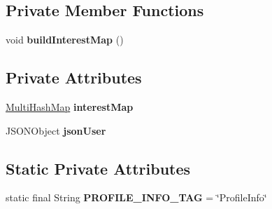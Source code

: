 \subsection*{Private Member Functions}
\begin{DoxyCompactItemize}
\item 
void {\bfseries build\+Interest\+Map} ()\hypertarget{classcom_1_1example_1_1sebastian_1_1tindertp_1_1commonTools_1_1ProfileInfo_a8d562369fc96d3a45db688558a87b998}{}\label{classcom_1_1example_1_1sebastian_1_1tindertp_1_1commonTools_1_1ProfileInfo_a8d562369fc96d3a45db688558a87b998}

\end{DoxyCompactItemize}
\subsection*{Private Attributes}
\begin{DoxyCompactItemize}
\item 
\hyperlink{classcom_1_1example_1_1sebastian_1_1tindertp_1_1commonTools_1_1MultiHashMap}{Multi\+Hash\+Map} {\bfseries interest\+Map}\hypertarget{classcom_1_1example_1_1sebastian_1_1tindertp_1_1commonTools_1_1ProfileInfo_abbc20b5242ba1b2957b09cf608342bd9}{}\label{classcom_1_1example_1_1sebastian_1_1tindertp_1_1commonTools_1_1ProfileInfo_abbc20b5242ba1b2957b09cf608342bd9}

\item 
J\+S\+O\+N\+Object {\bfseries json\+User}\hypertarget{classcom_1_1example_1_1sebastian_1_1tindertp_1_1commonTools_1_1ProfileInfo_aec90faa9e53b0ace65c0cbe0f6c97c67}{}\label{classcom_1_1example_1_1sebastian_1_1tindertp_1_1commonTools_1_1ProfileInfo_aec90faa9e53b0ace65c0cbe0f6c97c67}

\end{DoxyCompactItemize}
\subsection*{Static Private Attributes}
\begin{DoxyCompactItemize}
\item 
static final String {\bfseries P\+R\+O\+F\+I\+L\+E\+\_\+\+I\+N\+F\+O\+\_\+\+T\+AG} = \char`\"{}Profile\+Info\char`\"{}\hypertarget{classcom_1_1example_1_1sebastian_1_1tindertp_1_1commonTools_1_1ProfileInfo_a0c6d95a1009d6a45006318baaaff0a79}{}\label{classcom_1_1example_1_1sebastian_1_1tindertp_1_1commonTools_1_1ProfileInfo_a0c6d95a1009d6a45006318baaaff0a79}

\end{DoxyCompactItemize}


